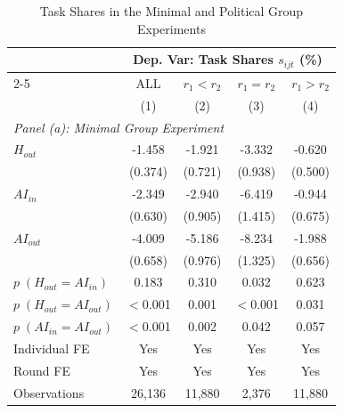 \begin{table}[H]
\centering
\caption{Task Shares in the Minimal and Political Group Experiments}
\footnotesize
\begin{threeparttable}
\begin{tabular}{l*{4}{c}}
\toprule\toprule
 & \multicolumn{4}{c}{Dep. Var: Task Shares $s_{ijt}$ (\%)} \\
\cmidrule(lr){2-5}
 & ALL & $r_1 < r_2$ & $r_1 = r_2$ & $r_1 > r_2$ \\
            &\multicolumn{1}{c}{(1)}         &\multicolumn{1}{c}{(2)}         &\multicolumn{1}{c}{(3)}         &\multicolumn{1}{c}{(4)}         \\
\midrule
\multicolumn{5}{l}{\textit{Panel (a): Minimal Group Experiment}} \\
$H_{out}$   &      -1.458\sym{***}&      -1.921\sym{***}&      -3.332\sym{***}&      -0.620         \\
            &     (0.374)         &     (0.721)         &     (0.938)         &     (0.500)         \\
\addlinespace
$AI_{in}$   &      -2.349\sym{***}&      -2.940\sym{***}&      -6.419\sym{***}&      -0.944         \\
            &     (0.630)         &     (0.905)         &     (1.415)         &     (0.675)         \\
\addlinespace
$AI_{out}$  &      -4.009\sym{***}&      -5.186\sym{***}&      -8.234\sym{***}&      -1.988\sym{***}\\
            &     (0.658)         &     (0.976)         &     (1.325)         &     (0.656)         \\
\midrule
$p\;(H_{out} = AI_{in})$&       0.183         &       0.310         &       0.032         &       0.623         \\
$p\;(H_{out} = AI_{out})$&    $<$0.001         &       0.001         &    $<$0.001         &       0.031         \\
$p\;(AI_{in} = AI_{out})$&    $<$0.001         &       0.002         &       0.042         &       0.057         \\
Individual FE&         Yes         &         Yes         &         Yes         &         Yes         \\
Round FE    &         Yes         &         Yes         &         Yes         &         Yes         \\
Observations&      26,136         &      11,880         &       2,376         &      11,880         \\

\end{tabular}
\end{threeparttable}
\end{table}
